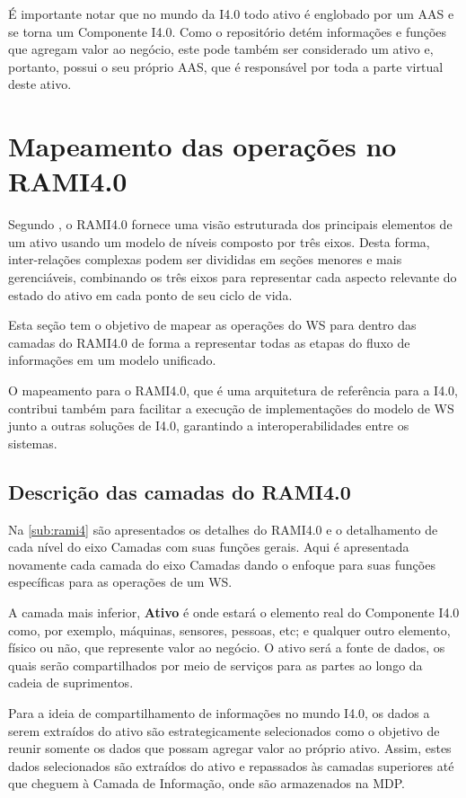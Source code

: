 	É importante notar que no mundo da I4.0 todo ativo é englobado por um AAS e se torna um Componente I4.0. Como o repositório detém informações e funções que agregam valor ao negócio, este pode também ser considerado um ativo e, portanto, possui o seu próprio AAS, que é responsável por toda a parte virtual deste ativo.
	
\section{Mapeamento das operações no RAMI4.0}
	
	Segundo , o RAMI4.0 fornece uma visão estruturada dos principais elementos de um ativo usando um modelo de níveis composto por três eixos. Desta forma, inter-relações complexas podem ser divididas em seções menores e mais gerenciáveis, combinando os três eixos para representar cada aspecto relevante do estado do ativo em cada ponto de seu ciclo de vida.
	
	Esta seção tem o objetivo de mapear as operações do WS para dentro das camadas do RAMI4.0 de forma a representar todas as etapas do fluxo de informações em um modelo unificado.
	
	O mapeamento para o RAMI4.0, que é uma arquitetura de referência para a I4.0, contribui também para facilitar a execução de implementações do modelo de WS junto a outras soluções de I4.0, garantindo a interoperabilidades entre os sistemas.

\subsection{Descrição das camadas do RAMI4.0}

	Na \autoref{sub:rami4} são apresentados os detalhes do RAMI4.0 e o detalhamento de cada nível do eixo Camadas com suas funções gerais. Aqui é apresentada novamente cada camada do eixo Camadas dando o enfoque para suas funções específicas para as operações de um WS.

	A camada mais inferior, \textbf{Ativo} é onde estará o elemento real do Componente I4.0 como, por exemplo, máquinas, sensores, pessoas, etc; e qualquer outro elemento, físico ou não, que represente valor ao negócio. O ativo será a fonte de dados, os quais serão compartilhados por meio de serviços para as partes ao longo da cadeia de suprimentos.
	
	Para a ideia de compartilhamento de informações no mundo I4.0, os dados a serem extraídos do ativo são estrategicamente selecionados como o objetivo de reunir somente os dados que possam agregar valor ao próprio ativo. Assim, estes dados selecionados são extraídos do ativo e repassados às camadas superiores até que cheguem à Camada de Informação, onde são armazenados na MDP.
	
